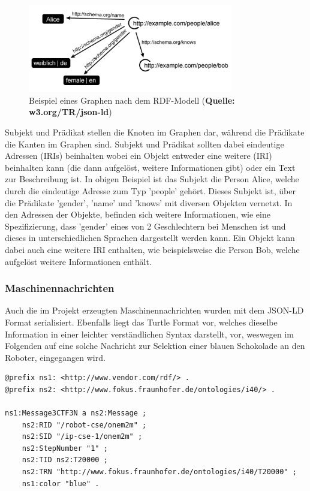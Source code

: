 \documentclass[
	12pt,								%
	DIV10,
	a4paper,         		%
	oneside,						%
	parskip=half,				%
	headings=normal,			%
	listof=totoc,					%
	bibliography=totoc,						%
	index=totoc,						%
	final								%
]{scrartcl}
\begin{document}
\begin{figure}[H]
\centering
\includegraphics[width=0.8\textwidth]{rdf}
\caption{Beispiel eines Graphen nach dem RDF-Modell (\textbf{Quelle: w3.org/TR/json-ld})}
\label{rdf}
\end{figure}
Subjekt und Prädikat stellen die Knoten im Graphen dar, während die Prädikate die Kanten im Graphen sind. Subjekt und Prädikat sollten dabei eindeutige Adressen (IRIs) beinhalten wobei ein Objekt entweder eine weitere (IRI) beinhalten kann (die dann aufgelöst, weitere Informationen gibt) oder ein Text zur Beschreibung ist.
In obigen Beispiel ist das Subjekt die Person Alice, welche durch die eindeutige Adresse zum Typ 'people' gehört. Dieses Subjekt ist, über die Prädikate 'gender', 'name' und 'knows' mit diversen Objekten vernetzt. In den Adressen der Objekte, befinden sich weitere Informationen, wie eine Spezifizierung, dass 'gender' eines von 2 Geschlechtern bei Menschen ist und dieses in unterschiedlichen Sprachen dargestellt werden kann. Ein Objekt kann dabei auch eine weitere IRI enthalten, wie beispielsweise die Person Bob, welche aufgelöst weitere Informationen enthält.
\newpage
\subsubsection*{Maschinennachrichten}
Auch die im Projekt erzeugten Maschinennachrichten wurden mit dem JSON-LD Format serialisiert. Ebenfalls liegt das Turtle Format vor, welches dieselbe Information in einer leichter verständlichen Syntax darstellt, vor, weswegen im Folgenden auf eine solche Nachricht zur Selektion einer blauen Schokolade an den Roboter, eingegangen wird. 


\begin{lstlisting}
@prefix ns1: <http://www.vendor.com/rdf/> .
@prefix ns2: <http://www.fokus.fraunhofer.de/ontologies/i40/> .

ns1:Message3CTF3N a ns2:Message ;
    ns2:RID "/robot-cse/onem2m" ;
    ns2:SID "/ip-cse-1/onem2m" ;
    ns2:StepNumber "1" ;
    ns2:TID ns2:T20000 ;
    ns2:TRN "http://www.fokus.fraunhofer.de/ontologies/i40/T20000" ;
    ns1:color "blue" .
\end{lstlisting}
\end{document}
